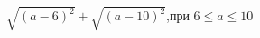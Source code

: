 \begin{ex}[type=calculate_expression]
	\begin{condition}
		\( \sqrt{(a-6)^2}+\sqrt{(a-10)^2} \),\quad при \( 6\le a \le10 \)
	\end{condition}
\end{ex}